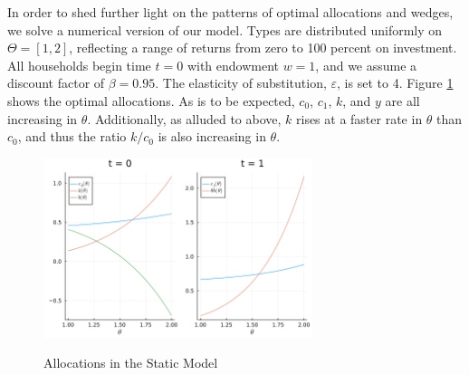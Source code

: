 \documentclass[11pt]{article}
\begin{document}
In order to shed further light on the patterns of optimal allocations and wedges, we solve a numerical version of our model. Types are distributed uniformly on \( \Theta = [1,2] \), reflecting a range of returns from zero to 100 percent on investment. All households begin time \( t=0 \) with endowment \( w = 1 \), and we assume a discount factor of \( \beta = 0.95 \). The elasticity of substitution, \( \varepsilon \), is set to 4. Figure \ref{fig:static_allocs} shows the optimal allocations. As is to be expected, \( c_0 \), \( c_1 \), \( k \), and \( y \) are all increasing in \( \theta \). Additionally, as alluded to above, \( k \) rises at a faster rate in \( \theta \) than \( c_0 \), and thus the ratio \( k/c_0 \) is also increasing in \( \theta \). 
\begin{figure}[htbp]
    \centering
    \caption{Allocations in the Static Model}
    \includegraphics[width = 0.7\textwidth]{figures/allocations.png}
    \label{fig:static_allocs}
\end{figure}
\end{document}
